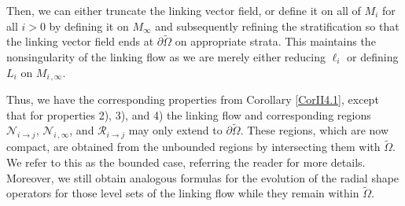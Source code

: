\documentclass[10pt]{amsart}
\theoremstyle{definition}
\theoremstyle{definition}
\numberwithin{equation}{section}
\def \cN {\mathcal{N}}
\def \cR {\mathcal{R}}
\def \gW {\Omega}
\begin{document}
\par
Then, we can either truncate the linking vector field, or define it on all of 
$M_i$ for all $i>0$ by defining it on  $M_{\infty}$ and subsequently 
refining the stratification so that the linking vector field ends at 
$\partial \tilde \gW$ on appropriate strata.   This maintains the 
nonsingularity of the linking flow as we are merely either reducing 
$\ell_i$ or defining $L_i$ on $M_{i\,, \infty}$. 
\par
Thus, we have the corresponding properties from Corollary \ref{CorII4.1}, 
except that for properties 2), 3), and 4) the linking flow and corresponding 
regions $\cN_{i \to j}$, $\cN_{i \, ,\infty}$, and $\cR_{i \to j}$ may only 
extend to $\partial \tilde \gW$.  These regions, which are now compact, 
are obtained from the unbounded regions by intersecting them with $\tilde 
\gW$.  We refer to this as the bounded case, referring the reader \cite[\S 
3]{DG1} for more details.  Moreover, we still obtain analogous formulas for 
the evolution of the radial shape operators for those level sets of the 
linking flow while they remain within $\tilde \gW$.   \par

\end{document}
